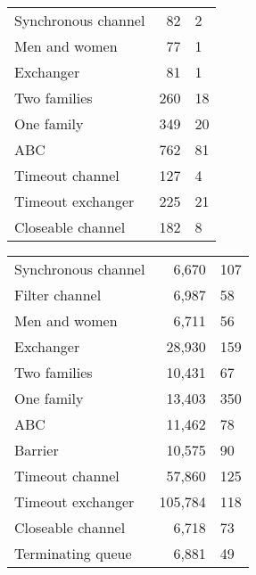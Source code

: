 
\begin{figure}
\begin{minipage}{0.48\textwidth}%
\begin{tabular}{@{}lr@{$\null\pm\null$}l} %
Synchronous channel    & 82 & 2 \\
Men and women         & 77 &  1 \\
Exchanger            &  81 & 1 \\
Two families          & 260 & 18\\
One family            & 349 & 20\\
ABC      	       & 762 & 81\\
Timeout channel  	& 127	 & 4 \\
Timeout exchanger  	& 225	 & 21 \\
Closeable channel     & 182 & 8\\
\end{tabular}
\end{minipage}
\begin{minipage}{0.51\textwidth}
\begin{tabular}{lr@{$\null\pm\null$}l@{}} %
Synchronous channel  	& 6,670	 & 107 \\
Filter channel  	& 6,987	 & 58 \\
Men and women  	& 6,711	 & 56 \\
Exchanger  	& 28,930	 & 159 \\
Two families  	& 10,431	 & 67 \\
One family  	& 13,403	 & 350 \\
ABC  	& 11,462	 & 78 \\
Barrier  	& 10,575	 & 90 \\
Timeout channel  	& 57,860	 & 125 \\
Timeout exchanger  	& 105,784	 & 118 \\
Closeable channel  	& 6,718	 & 73 \\
Terminating queue  	& 6,881	 & 49

\end{tabular}
\end{minipage}
\end{figure}
